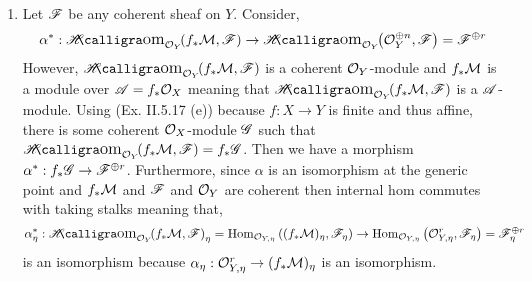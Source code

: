\documentclass[12pt]{article}
\begin{document}
\begin{enumerate}
\item Let $\mathscr{F}$ be any coherent sheaf on $Y$. Consider,
\[ \alpha^* : \shHom{\struct{Y}}{f_* \M}{\F} \to \shHom{\struct{Y}}{\struct{Y}^{\oplus n}}{\F} = \F^{\oplus r} \]
However, $\shHom{\struct{Y}}{f_* \M}{\F}$ is a coherent $\mathcal{O}_{Y}$-module and $f_* \mathcal{M}$ is a module over $\mathscr{A} = f_* \mathcal{O}_{X}$ meaning that $\shHom{\struct{Y}}{f_* \M}{\F}$ is a $\mathscr{A}$-module. Using (Ex. II.5.17 (e)) because $f : X \to Y$ is finite and thus affine, there is some coherent $\mathcal{O}_{X}$-module $\mathscr{G}$ such that $\shHom{\struct{Y}}{f_* \M}{\F} = f_* \G$. Then we have a morphism $\alpha^* : f_* \mathscr{G} \to \mathscr{F}^{\oplus r}$. Furthermore, since $\alpha$ is an isomorphism at the generic point and $f_* \mathcal{M}$ and $\mathscr{F}$ and $\mathcal{O}_{Y}$ are coherent then internal hom commutes with taking stalks meaning that,
\[ \alpha^*_\eta : \shHom{\struct{Y}}{f_* \M}{\F}_\eta = \Hom{\stalk{Y}{\eta}}{(f_* \M)_\eta}{\F_\eta} \to \Hom{\stalk{Y}{\eta}}{\stalk{Y}{\eta}^r}{\F_\eta} = \F^{\oplus r}_\eta \]
is an isomorphism because $\alpha_\eta : \mathcal{O}_{Y, \eta}^r \to (f_* \mathcal{M})_\eta$ is an isomorphism.



\end{enumerate}
\end{document}
